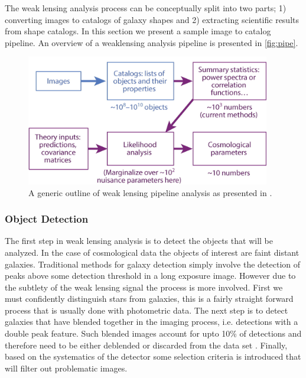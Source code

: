 The weak lensing analysis process can be conceptually split into two parts; 1) converting images to catalogs of galaxy shapes and 2) extracting scientific results from shape catalogs. In this section we present a sample image to catalog pipeline. An overview of a weaklensing analysis pipeline is presented in \autoref{fig:pipe}.

\begin{figure}
    \begin{small}
        \begin{center}
            \includegraphics[width=0.95\textwidth]{WeakLensing/figs/pipe.jpg}
        \end{center}
        \caption{A generic outline of weak lensing pipeline analysis as presented in \cite{rachel_2018}.}
        \label{fig:pipe}
    \end{small}
\end{figure}


\subsubsection{Object Detection}

The first step in weak lensing analysis is to detect the objects that will be analyzed. In the case of cosmological data the objects of interest are faint distant galaxies. Traditional methods for galaxy detection simply involve the detection of peaks above some detection threshold in a long exposure image. However due to the subtlety of the weak lensing signal the process is more involved. First we must confidently distinguish stars from galaxies, this is a fairly straight forward process that is usually done with photometric data. The next step is to detect galaxies that have blended together in the imaging process, i.e. detections with a double peak feature. Such blended images account for upto 10\% of detections and therefore need to be either deblended or discarded from the data set \cite{rachel_2018,general_2013}. Finally, based on the systematics of the detector some selection criteria is introduced that will filter out problematic images. 

